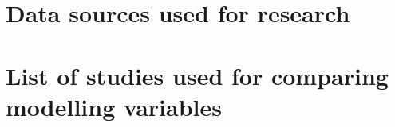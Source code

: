 \documentclass[titlesmallcaps,copyrightpage,examinerscopy]{uomthesis}
\begin{document}
%
\chapter{Data sources used for research}\label{apx:C}
\clearpage{\pagestyle{empty}\cleardoublepage}

%
\chapter{List of studies used for comparing modelling variables}\label{apx:D}
\clearpage{\pagestyle{empty}\cleardoublepage}

%
%
%
\end{document}
